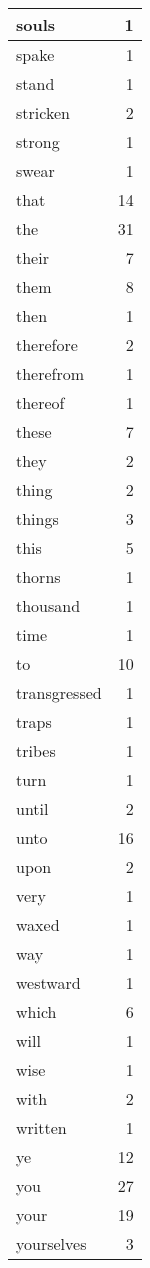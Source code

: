 \begin{center}
\begin{longtable}{l|r}
souls & 1\\ \hline 
spake & 1\\ \hline 
stand & 1\\ \hline 
stricken & 2\\ \hline 
strong & 1\\ \hline 
swear & 1\\ \hline 
that & 14\\ \hline 
the & 31\\ \hline 
their & 7\\ \hline 
them & 8\\ \hline 
then & 1\\ \hline 
therefore & 2\\ \hline 
therefrom & 1\\ \hline 
thereof & 1\\ \hline 
these & 7\\ \hline 
they & 2\\ \hline 
thing & 2\\ \hline 
things & 3\\ \hline 
this & 5\\ \hline 
thorns & 1\\ \hline 
thousand & 1\\ \hline 
time & 1\\ \hline 
to & 10\\ \hline 
transgressed & 1\\ \hline 
traps & 1\\ \hline 
tribes & 1\\ \hline 
turn & 1\\ \hline 
until & 2\\ \hline 
unto & 16\\ \hline 
upon & 2\\ \hline 
very & 1\\ \hline 
waxed & 1\\ \hline 
way & 1\\ \hline 
westward & 1\\ \hline 
which & 6\\ \hline 
will & 1\\ \hline 
wise & 1\\ \hline 
with & 2\\ \hline 
written & 1\\ \hline 
ye & 12\\ \hline 
you & 27\\ \hline 
your & 19\\ \hline 
yourselves & 3\\ \hline 
\end{longtable}
\end{center}



